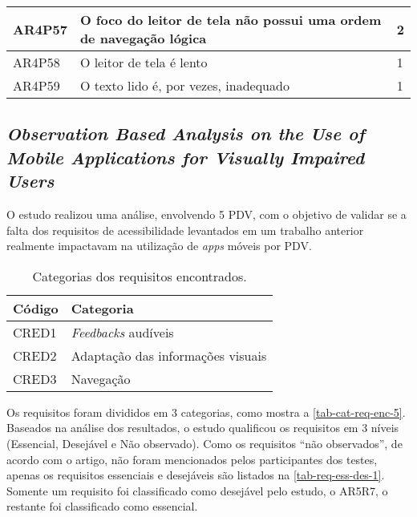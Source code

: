 \begin{table}[htb]
\begin{center}
\begin{tabular}{p{1.2cm}|p{12.0cm}|p{1.4cm}}
      \hline
      AR4P57          & O foco do leitor de tela não possui uma ordem de navegação lógica                                & 2                 \\
      \hline
      AR4P58          & O leitor de tela é lento                                                                         & 1                 \\
      \hline
      AR4P59          & O texto lido é, por vezes, inadequado                                                            & 1                 \\
    \end{tabular}
  \end{center}
\end{table}

\subsection{\emph{Observation Based Analysis on the Use of Mobile Applications for Visually Impaired Users}}

O estudo realizou uma análise, envolvendo 5 PDV, com o objetivo de validar se a falta dos requisitos de acessibilidade levantados em um trabalho anterior realmente impactavam na utilização de \emph{apps} móveis por PDV.

\begin{table}[htb]
  \begin{center}
    \ABNTEXfontereduzida
    \caption{Categorias dos requisitos encontrados.}
    \label{tab-cat-req-enc-5}
    \begin{tabular}{p{2.0cm}|p{5.0cm}}
      \textbf{Código} & \textbf{Categoria}                \\
      \hline
      CRED1           & \emph{Feedbacks} audíveis         \\
      \hline
      CRED2           & Adaptação das informações visuais \\
      \hline
      CRED3           & Navegação                         \\
    \end{tabular}
  \end{center}
\end{table}

Os requisitos foram divididos em 3 categorias, como mostra a \autoref{tab-cat-req-enc-5}.
Baseados na análise dos resultados, o estudo qualificou os requisitos em 3 níveis (Essencial, Desejável e Não observado).
Como os requisitos ``não observados'', de acordo com o artigo, não foram mencionados pelos participantes dos testes, apenas os requisitos essenciais e desejáveis são listados na \autoref{tab-req-ess-des-1}.
Somente um requisito foi classificado como desejável pelo estudo, o AR5R7, o restante foi classificado como essencial.

